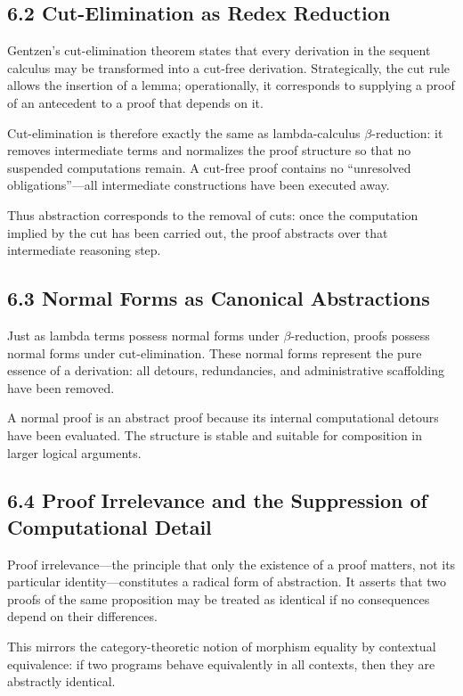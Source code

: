 \documentclass[12pt,letterpaper]{article}
\begin{document}
\subsection{6.2 Cut-Elimination as Redex Reduction}

Gentzen’s cut-elimination theorem states that every derivation in the sequent calculus may be transformed into a cut-free derivation. Strategically, the cut rule allows the insertion of a lemma; operationally, it corresponds to supplying a proof of an antecedent to a proof that depends on it.

Cut-elimination is therefore exactly the same as lambda-calculus \(\beta\)-reduction: it removes intermediate terms and normalizes the proof structure so that no suspended computations remain. A cut-free proof contains no ``unresolved obligations''—all intermediate constructions have been executed away.

Thus abstraction corresponds to the removal of cuts: once the computation implied by the cut has been carried out, the proof abstracts over that intermediate reasoning step.

\subsection{6.3 Normal Forms as Canonical Abstractions}

Just as lambda terms possess normal forms under \(\beta\)-reduction, proofs possess normal forms under cut-elimination. These normal forms represent the pure essence of a derivation: all detours, redundancies, and administrative scaffolding have been removed.

A normal proof is an abstract proof because its internal computational detours have been evaluated. The structure is stable and suitable for composition in larger logical arguments.

\subsection{6.4 Proof Irrelevance and the Suppression of Computational Detail}

Proof irrelevance—the principle that only the existence of a proof matters, not its particular identity—constitutes a radical form of abstraction. It asserts that two proofs of the same proposition may be treated as identical if no consequences depend on their differences.

This mirrors the category-theoretic notion of morphism equality by contextual equivalence: if two programs behave equivalently in all contexts, then they are abstractly identical.
\end{document}
